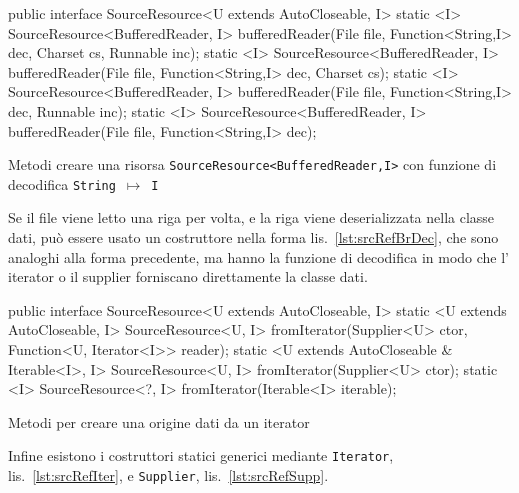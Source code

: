 \begin{elisting}[!htb]
    \begin{javacode}
        public interface SourceResource<U extends AutoCloseable, I> {
    static <I> SourceResource<BufferedReader, I> bufferedReader(File file, Function<String,I> dec,
                                                                Charset cs, Runnable inc);
    static <I> SourceResource<BufferedReader, I> bufferedReader(File file, Function<String,I> dec, Charset cs);
    static <I> SourceResource<BufferedReader, I> bufferedReader(File file, Function<String,I> dec, Runnable inc);
    static <I> SourceResource<BufferedReader, I> bufferedReader(File file, Function<String,I> dec);
}
    \end{javacode}
    \caption[Metodi creare una risorsa \texttt{SourceResource<BufferedReader,I>}
    con funzione di decodifica]{Metodi creare una risorsa \texttt{SourceResource<BufferedReader,I>}
    con funzione di decodifica \texttt{String}~$\mapsto$~\texttt{I}}
    \label{lst:srcRefBrDec}
\end{elisting}
Se il file viene letto una riga per volta, e la riga viene deserializzata nella
classe dati, può essere usato un costruttore nella forma
lis.~\ref{lst:srcRefBrDec}, che sono analoghi alla forma precedente, ma hanno
la funzione di decodifica in modo che l'\,iterator o il supplier forniscano
direttamente la classe dati.

\begin{elisting}[!htb]
    \begin{javacode}
        public interface SourceResource<U extends AutoCloseable, I> {
    static <U extends AutoCloseable, I> SourceResource<U, I> fromIterator(Supplier<U> ctor,
                                                                          Function<U, Iterator<I>> reader);
    static <U extends AutoCloseable & Iterable<I>, I> SourceResource<U, I> fromIterator(Supplier<U> ctor);
    static <I> SourceResource<?, I> fromIterator(Iterable<I> iterable);
}
    \end{javacode}
    \caption{Metodi per creare una origine dati da un iterator}
    \label{lst:srcRefIter}
\end{elisting}
Infine esistono i costruttori statici generici mediante \texttt{Iterator},
lis.~\ref{lst:srcRefIter}, e \texttt{Supplier}, lis.~\ref{lst:srcRefSupp}.

